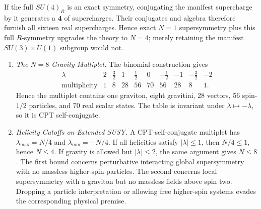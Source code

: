 \begin{enumerate}
\begin{enumerate}
      If the full \(SU(4)_R\) is an exact symmetry, conjugating the manifest
      supercharge by it generates a \(\mathbf4\) of supercharges.  Their
      conjugates and algebra therefore furnish all sixteen real
      supercharges.  Hence exact \(N=1\) supersymmetry plus this full
      \(R\)-symmetry upgrades the theory to \(N=4\); merely retaining the
      manifest \(SU(3)\times U(1)\) subgroup would not.
  \end{enumerate}

  \begin{enumerate}
    \item \emph{The \(N=8\) Gravity Multiplet.}
    The binomial construction gives
      \[
      \begin{array}{c|rrrrrrrrr}
        \lambda&2&\frac32&1&\frac12&0&
          -\frac12&-1&-\frac32&-2\\ \hline
        \text{multiplicity}&1&8&28&56&70&56&28&8&1 .
      \end{array}
      \]
      Hence the multiplet contains one graviton, eight gravitini, 28 vectors,
      56 spin-\(1/2\) particles, and 70 real scalar states.  The table is
      invariant under \(\lambda\mapsto-\lambda\), so it is CPT
      self-conjugate.
    \item \emph{Helicity Cutoffs on Extended SUSY.}
    A CPT-self-conjugate multiplet has
      \(\lambda_{\max}=N/4\) and
      \(\lambda_{\min}=-N/4\).  If all helicities satisfy
      \(|\lambda|\leq1\), then \(N/4\leq1\), hence \(N\leq4\).  If gravity is
      allowed but \(|\lambda|\leq2\), the same argument gives \(N\leq8\).
      The first bound concerns perturbative interacting global supersymmetry
      with no massless higher-spin particles.  The second concerns local
      supersymmetry with a graviton but no massless fields above spin two.
      Dropping a particle interpretation or allowing free higher-spin systems
      evades the corresponding physical premise.
  \end{enumerate}


\end{enumerate}
